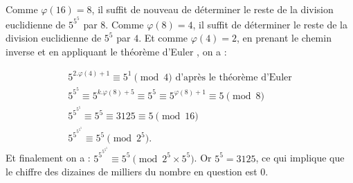 \documentclass[10pt,a4paper]{article}
\begin{document}
\begin{enumerate}
Comme $\varphi(16)=8$, il suffit de nouveau de déterminer le reste de la division euclidienne de $5^{5^{5}}$ par $8$. Comme $\varphi(8)=4$, il suffit 
de déterminer le reste de la division euclidienne de $5^5$ par $4$. Et comme $\varphi(4)=2$, en prenant le chemin inverse et en appliquant le théorème d'Euler
, on a : 

$$\begin{array}{c}
5^{2.\varphi(4)+1}\equiv 5^1 \pmod{4} \text{ d'après le théorème d'Euler} \\
5^{5^5}\equiv 5^{k.\varphi(8)+5}\equiv 5^5\equiv 5^{\varphi(8)+1}\equiv 5 \pmod{8} \\
5^{5^{5^{5}}}\equiv 5^5 \equiv 3125 \equiv 5 \pmod{16} \\
5^{5^{5^{5^{5}}}}\equiv 5^5 \pmod{2^5}.
\end{array}$$
Et finalement on a : $5^{5^{5^{5^{5}}}}\equiv 5^5 \pmod{2^5\times 5^5}$. Or $5^5=3125$, ce qui implique que le chiffre des dizaines de milliers du nombre en question
est $0$.
\end{enumerate}
\end{document}
